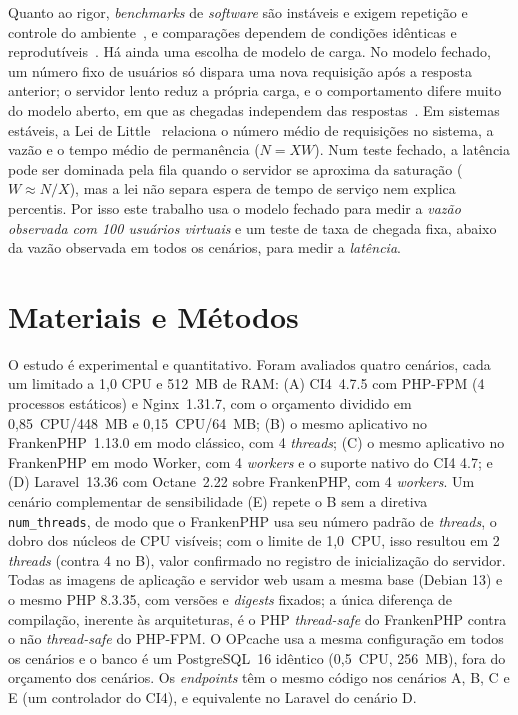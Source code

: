 \documentclass[sigconf, nonacm, screen, anonymous, language=portuguese, language=spanish, language={main=english}]{acmart}
\begin{document}
Quanto ao rigor, \textit{benchmarks} de \textit{software} são instáveis e exigem repetição e controle do ambiente~\cite{laaber2021}, e comparações dependem de condições idênticas e reprodutíveis~\cite{zhan2022,brunst2022,jia2013}. Há ainda uma escolha de modelo de carga. No modelo fechado, um número fixo de usuários só dispara uma nova requisição após a resposta anterior; o servidor lento reduz a própria carga, e o comportamento difere muito do modelo aberto, em que as chegadas independem das respostas~\cite{schroeder2006,grafanaopen}. Em sistemas estáveis, a Lei de Little~\cite{little1961} relaciona o número médio de requisições no sistema, a vazão e o tempo médio de permanência ($N=XW$). Num teste fechado, a latência pode ser dominada pela fila quando o servidor se aproxima da saturação ($W\approx N/X$), mas a lei não separa espera de tempo de serviço nem explica percentis. Por isso este trabalho usa o modelo fechado para medir a \emph{vazão observada com 100 usuários virtuais} e um teste de taxa de chegada fixa, abaixo da vazão observada em todos os cenários, para medir a \emph{latência}.

\section{Materiais e Métodos}
O estudo é experimental e quantitativo. Foram avaliados quatro cenários, cada um limitado a 1,0 CPU e 512~MB de RAM: (A) CI4~4.7.5 com PHP-FPM (4 processos estáticos) e Nginx~1.31.7, com o orçamento dividido em 0,85~CPU/448~MB e 0,15~CPU/64~MB; (B) o mesmo aplicativo no FrankenPHP~1.13.0 em modo clássico, com 4 \textit{threads}; (C) o mesmo aplicativo no FrankenPHP em modo Worker, com 4 \textit{workers} e o suporte nativo do CI4 4.7; e (D) Laravel~13.36 com Octane~2.22 sobre FrankenPHP, com 4 \textit{workers}. Um cenário complementar de sensibilidade (E) repete o B sem a diretiva \texttt{num\_threads}, de modo que o FrankenPHP usa seu número padrão de \textit{threads}, o dobro dos núcleos de CPU visíveis; com o limite de 1,0~CPU, isso resultou em 2 \textit{threads} (contra 4 no B), valor confirmado no registro de inicialização do servidor. Todas as imagens de aplicação e servidor web usam a mesma base (Debian 13) e o mesmo PHP 8.3.35, com versões e \textit{digests} fixados; a única diferença de compilação, inerente às arquiteturas, é o PHP \textit{thread-safe} do FrankenPHP contra o não \textit{thread-safe} do PHP-FPM. O OPcache usa a mesma configuração em todos os cenários e o banco é um PostgreSQL~16 idêntico (0,5~CPU, 256~MB), fora do orçamento dos cenários. Os \textit{endpoints} têm o mesmo código nos cenários A, B, C e E (um controlador do CI4), e equivalente no Laravel do cenário D.
\end{document}
